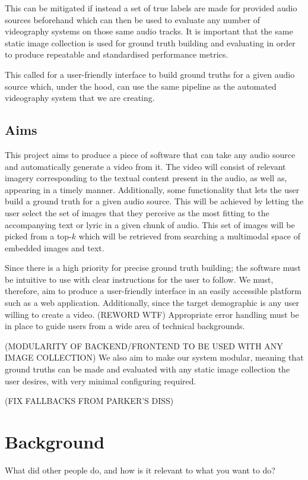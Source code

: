 \documentclass{l4proj}
\begin{document}
This can be mitigated if instead a set of true labels are made for provided audio sources beforehand which can then be used to evaluate any number of videography systems on those same audio tracks. It is important that the same static image collection is used for ground truth building and evaluating in order to produce repeatable and standardised performance metrics.

This called for a user-friendly interface to build ground truths for a given audio source which, under the hood, can use the same pipeline as the automated videography system that we are creating.

\section{Aims}
This project aims to produce a piece of software that can take any audio source and automatically generate a video from it. The video will consist of relevant imagery corresponding to the textual content present in the audio, as well as, appearing in a timely manner. Additionally, some functionality that lets the user build a ground truth for a given audio source. This will be achieved by letting the user select the set of images that they perceive as the most fitting to the accompanying text or lyric in a given chunk of audio. This set of images will be picked from a top-$k$ which will be retrieved from searching a multimodal space of embedded images and text.

Since there is a high priority for precise ground truth building; the software must be intuitive to use with clear instructions for the user to follow. We must, therefore, aim to produce a user-friendly interface in an easily accessible platform such as a web application. Additionally, since the target demographic is any user willing to create a video. (REWORD WTF) Appropriate error handling must be in place to guide users from a wide area of technical backgrounds.

(MODULARITY OF BACKEND/FRONTEND TO BE USED WITH ANY IMAGE COLLECTION)
We also aim to make our system modular, meaning that ground truths can be made and evaluated with any static image collection the user desires, with very minimal configuring required. 

(FIX FALLBACKS FROM PARKER'S DISS)


\chapter{Background}
What did other people do, and how is it relevant to what you want to do?
\end{document}

